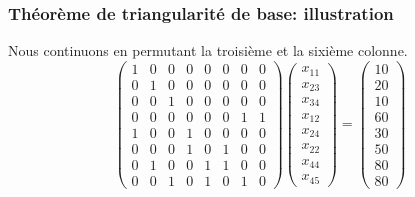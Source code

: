 \documentclass[usepdftitle=false, aspectratio=169]{beamer}
\begin{document}
\begin{frame}
\frametitle{Théorème de triangularité de base: illustration}

Nous continuons en permutant la troisième et la sixième colonne.
\[
\begin{pmatrix}
 1 & 0 & 0 & 0 & 0 & 0 & 0 & 0 \\
 0 & 1 & 0 & 0 & 0 & 0 & 0 & 0 \\
 0 & 0 & 1 & 0 & 0 & 0 & 0 & 0 \\
 0 & 0 & 0 & 0 & 0 & 0 & 1 & 1 \\
 1 & 0 & 0 & 1 & 0 & 0 & 0 & 0 \\
 0 & 0 & 0 & 1 & 0 & 1 & 0 & 0 \\
 0 & 1 & 0 & 0 & 1 & 1 & 0 & 0 \\
 0 & 0 & 1 & 0 & 1 & 0 & 1 & 0
\end{pmatrix}
\begin{pmatrix}
x_{11} \\
x_{23} \\
x_{34} \\
x_{12} \\
x_{24} \\
x_{22} \\
x_{44} \\
x_{45}
\end{pmatrix}
=
\begin{pmatrix}
10 \\
20 \\
10 \\
60 \\
30 \\
50 \\
80 \\
80
\end{pmatrix}
\]

\end{frame}
\end{document}
